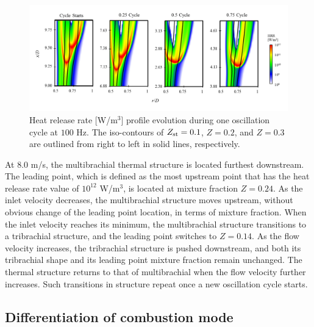 \documentclass[review,3p,times]{elsarticle}
\begin{document}
\begin{figure}[t]
  \centering
  \scriptsize
  \vspace{-0.10in}
  \includegraphics[trim=6.5mm 7.5mm 7mm 8mm, clip=true, width=1.0\textwidth]{HRR_100Hz.png}
  \normalsize
  \vspace{-0.2in}
  \caption{Heat release rate [W/m$^3$] profile evolution during one oscillation cycle at $100$ Hz.  The iso-contours of $Z_{\rm st} = 0.1$, $Z = 0.2$, and $Z = 0.3$ are outlined from right to left in solid lines, respectively.}
  \label{fig:HRR_100Hz}
\end{figure}


At $8.0$ m/s, the multibrachial thermal structure is located furthest downstream.  The leading point, which is defined as the most upstream point that has the heat release rate value of $10^{12}$ W/m$^3$, is located at mixture fraction $Z = 0.24$.  As the inlet velocity decreases, the multibrachial structure moves upstream, without obvious change of the leading point location, in terms of mixture fraction.  When the inlet velocity reaches its minimum, the multibrachial structure transitions to a tribrachial structure, and the leading point switches to $Z = 0.14$.  As the flow velocity increases, the tribrachial structure is pushed downstream, and both its tribrachial shape and its leading point mixture fraction remain unchanged.  The thermal structure returns to that of multibrachial when the flow velocity further increases.  Such transitions in structure repeat once a new oscillation cycle starts.

\subsection{Differentiation of combustion mode}
\end{document}
